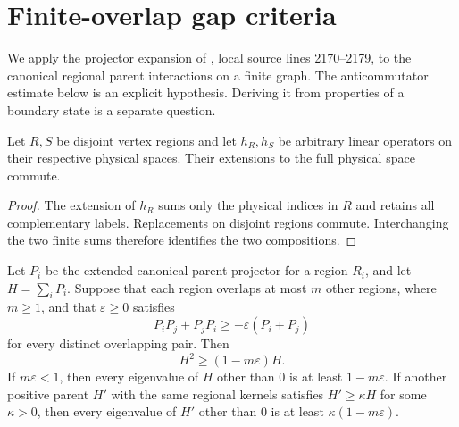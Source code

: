 \section{Finite-overlap gap criteria}%
\label{sec:peps_region_parent_gap_criterion}

We apply the projector expansion of
\cite[Section~IV.C.3]{Cirac2021Matrix}, local source lines 2170--2179,
to the canonical regional parent interactions on a finite graph.
The anticommutator estimate below is an explicit hypothesis.
Deriving it from properties of a boundary state is a separate question.

\begin{lemma}%
    \label{thm:peps_disjoint_region_interactions_commute}
    \leanok
    Let $R,S$ be disjoint vertex regions and let $h_R,h_S$
    be arbitrary linear operators on their respective physical spaces.
    Their extensions to the full physical space commute.
\end{lemma}

\begin{proof}\leanok
    The extension of $h_R$ sums only the physical indices in $R$
    and retains all complementary labels. Replacements on disjoint
    regions commute. Interchanging the two finite sums therefore
    identifies the two compositions.
\end{proof}

\begin{lemma}%
    \label{thm:peps_finite_overlap_gap}
    \leanok
    Let $P_i$ be the extended canonical parent projector for
    a region $R_i$, and let $H=\sum_i P_i$.
    Suppose that each region overlaps at most $m$ other regions,
    where $m\ge1$, and that $\varepsilon\ge0$ satisfies
    \[
        P_iP_j+P_jP_i\ge-\varepsilon(P_i+P_j)
    \]
    for every distinct overlapping pair. Then
    \[
        H^2\ge(1-m\varepsilon)H.
    \]
    If $m\varepsilon<1$, then every eigenvalue of $H$ other than $0$
    is at least $1-m\varepsilon$.
    If another positive parent $H'$ with the same regional kernels
    satisfies $H'\ge\kappa H$ for some $\kappa>0$, then every
    eigenvalue of $H'$ other than $0$ is at least
    $\kappa(1-m\varepsilon)$.
\end{lemma}

